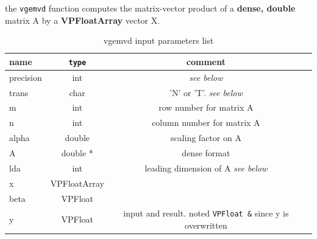 \documentclass[11pt]{report}
\begin{document}
the \texttt{vgemvd} function computes the matrix-vector product of a \textbf{dense, double} matrix A by a \textbf{VPFloatArray} vector X.
\begin{table}[h!]
  \begin{center}
    \caption{vgemvd input parameters list}
    \label{tab:table6}
    \begin{tabular}{l|c|c|r} %
      \textbf{name} & \texttt{type} & \textbf{comment}\\
      \hline
      precision & int & \emph{see below} \\ 
      \hline
      trans & char & 'N' or 'T'. \emph{see below} \\ 
      \hline
      m & int & row number for matrix A \\ 
      \hline
      n & int & column number for matrix A \\ 
      \hline
      alpha & double & scaling factor on A \\ 
      \hline
      A & double * & dense format\\ 
      \hline
      lda & int & leading dimension of A \emph{see below}  \\ 
      \hline
      x & VPFloatArray &  \\ 
      \hline
      beta & VPFloat &  \\ 
      \hline
      y & VPFloat & input and result. noted \texttt{VPFloat \&} since y is overwritten \\ 
      \hline
    \end{tabular}
  \end{center}
\end{table}
\end{document}
